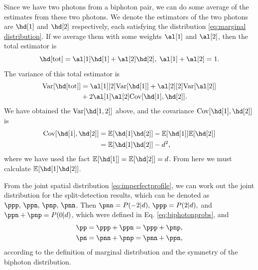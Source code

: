 Since we have two photons from a biphoton pair, we can do some
average of the estimates from these two photons. We denote the estimators
of the two photons are $\hd[1]$ and $\hd[2]$ respectively, each
satisfying the distribution \eqref{eq:marginal distribution}. If we average them with some weights $\al[1]$ and $\al[2]$,
then the total estimator is
\begin{equation}
\hd[\t]=\al[1]\hd[1]+\al[2]\hd[2],\;\al[1]+\al[2]=1.
\end{equation}
The variance of this total estimator is
\begin{equation}
\begin{aligned}\var{\hd[\t]} & =\al[1][2]\var{\hd[1]}+\al[2][2]\var{\al[2]}\\
 & +2\al[1]\al[2]\cov{\hd[1],\hd[2]}.
\end{aligned}
\end{equation}
We have obtained the $\var{\hd[1,2]}$ above, and the covariance $\cov{\hd[1],\hd[2]}$
is
\begin{equation}
\begin{aligned}\cov{\hd[1],\hd[2]} & =\E{\hd[1]\hd[2]}-\E{\hd[1]}\E{\hd[2]}\\
 & =\E{\hd[1]\hd[2]}-d^{2},
\end{aligned}
\label{eq:3}
\end{equation}
where we have used the fact $\E{\hd[1]}=\E{\hd[2]}=d$. From here we must calculate $\E{\hd[1]\hd[2]}$.

From the joint spatial distribution \eqref{eq:imperfectprofile},
we can work out the joint distribution for the split-detection results,
which can be denoted as $\ppp,\,\ppn,\,\pnp,\,\pnn$. Then $\pnn=P(-2|d),\,\ppp=P(2|d),$ and $\ppn+\pnp=P(0|d)$, which were defined in Eq. \eqref{eq:biphotonprobs}, and
\begin{equation}
\begin{aligned}\pp & =\ppp+\ppn=\ppp+\pnp,\\
\pn & =\pnn+\pnp=\pnn+\ppn,
\end{aligned}
\label{eq:1}
\end{equation}
according to the definition of marginal distribution and the symmetry
of the biphoton distribution.

